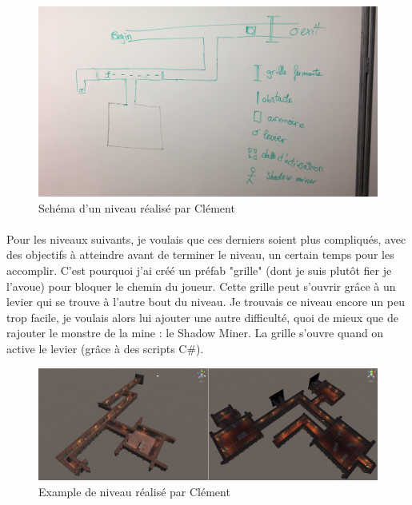 \documentclass[titlepage, 13px, a4paper]{report}
\begin{document}
\begin{figure}[h!]
  \centering
  \includegraphics[scale=0.3]{images/clement_schema.png}
  \caption{Schéma d'un niveau réalisé par Clément}
\end{figure}

\newpage

\paragraph*{} \hspace{0pt}
Pour les niveaux suivants, je voulais que ces derniers soient plus compliqués, avec des 
objectifs à atteindre avant de terminer le niveau, un certain temps pour les accomplir. 
C'est pourquoi j'ai créé un préfab "grille" (dont je suis plutôt fier je l'avoue) pour bloquer 
le chemin du joueur. Cette grille peut s'ouvrir grâce à un levier qui se trouve à l'autre bout 
du niveau. Je trouvais ce niveau encore un peu trop facile, je voulais alors lui ajouter une autre 
difficulté, quoi de mieux que de rajouter le monstre de la mine : le Shadow Miner. La grille 
s'ouvre quand on active le levier (grâce à des scripts C\#).  \\

\begin{figure}[h!]
  \centering
  \includegraphics[scale=0.4]{images/clement_map_Final.png}
  \caption{Example de niveau réalisé par Clément}
\end{figure}
\end{document}
